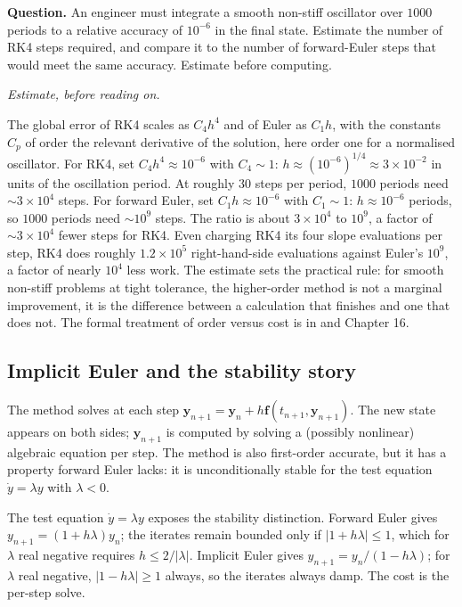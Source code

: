 \begin{estimation}
\textbf{Question.} An engineer must integrate a smooth non-stiff
oscillator over $1000$ periods to a relative accuracy of $10^{-6}$
in the final state. Estimate the number of RK4 steps required, and
compare it to the number of forward-Euler steps that would meet the
same accuracy. Estimate before computing.

\smallskip
\textit{Estimate, before reading on.}

\smallskip
The global error of RK4 scales as $C_{4} h^{4}$ and of Euler as
$C_{1} h$, with the constants $C_{p}$ of order the relevant
derivative of the solution, here order one for a normalised
oscillator. For RK4, set $C_{4} h^{4} \approx 10^{-6}$ with
$C_{4} \sim 1$: $h \approx (10^{-6})^{1/4} \approx 3 \times 10^{-2}$
in units of the oscillation period. At roughly $30$ steps per period,
$1000$ periods need $\sim 3 \times 10^{4}$ steps. For forward Euler,
set $C_{1} h \approx 10^{-6}$ with $C_{1} \sim 1$: $h \approx
10^{-6}$ periods, so $1000$ periods need $\sim 10^{9}$ steps. The
ratio is about $3 \times 10^{4}$ to $10^{9}$, a factor of $\sim 3
\times 10^{4}$ fewer steps for RK4. Even charging RK4 its four
slope evaluations per step, RK4 does roughly $1.2 \times 10^{5}$
right-hand-side evaluations against Euler's $10^{9}$, a factor of
nearly $10^{4}$ less work. The estimate sets the practical rule:
for smooth non-stiff problems at tight tolerance, the higher-order
method is not a marginal improvement, it is the difference between a
calculation that finishes and one that does not. The formal
treatment of order versus cost is in \textcite{text:v2ch07-hairer-norsett-wanner}
and Chapter 16.
\end{estimation}

\subsection{Implicit Euler and the stability story}

The  method solves at each step
$\mathbf{y}_{n+1} = \mathbf{y}_{n} + h \mathbf{f}(t_{n+1},
\mathbf{y}_{n+1})$. The new state appears on both sides;
$\mathbf{y}_{n+1}$ is computed by solving a (possibly nonlinear)
algebraic equation per step. The method is also first-order
accurate, but it has a property forward Euler lacks: it is
unconditionally stable for the test equation $\dot{y} = \lambda y$
with $\lambda < 0$.

The test equation $\dot{y} = \lambda y$ exposes the stability
distinction. Forward Euler gives $y_{n+1} = (1 + h \lambda) y_{n}$;
the iterates remain bounded only if $|1 + h \lambda| \leq 1$,
which for $\lambda$ real negative requires $h \leq 2/|\lambda|$.
Implicit Euler gives $y_{n+1} = y_{n}/(1 - h \lambda)$; for
$\lambda$ real negative, $|1 - h \lambda| \geq 1$ always, so the
iterates always damp. The cost is the per-step solve.

